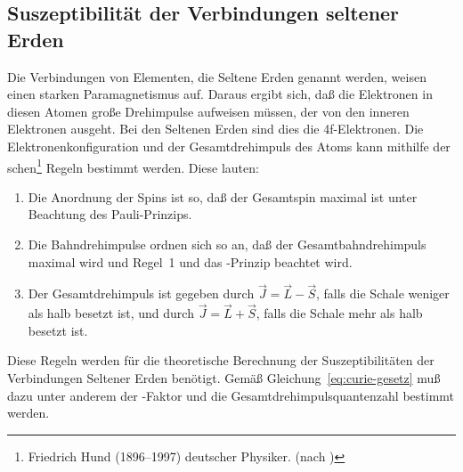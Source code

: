 \subsection{Suszeptibilität der Verbindungen seltener Erden}

Die Verbindungen von Elementen, die Seltene Erden genannt werden, weisen
einen starken Paramagnetismus auf.  Daraus ergibt sich, daß die
Elektronen in diesen Atomen große Drehimpulse aufweisen müssen, der von
den inneren Elektronen ausgeht.  Bei den Seltenen Erden sind dies die
4f-Elektronen.  Die Elektronenkonfiguration und der Gesamtdrehimpuls des
Atoms kann mithilfe der schen\footnote{Friedrich Hund
  (1896--1997) deutscher Physiker. (nach
  \textcite{wikipedia:friedrich-hund})} Regeln bestimmt werden. Diese
lauten:

\begin{enumerate}
\item Die Anordnung der Spins ist so, daß der Gesamtspin maximal ist
  unter Beachtung des Pauli-Prinzips.
\item Die Bahndrehimpulse ordnen sich so an, daß der
  Gesamtbahndrehimpuls maximal wird und Regel~1 und das
  -Prinzip beachtet wird.
\item Der Gesamtdrehimpuls ist gegeben durch $\vec{J} = \vec{L} -
  \vec{S}$, falls die Schale weniger als halb besetzt ist, und durch
  $\vec{J} = \vec{L} + \vec{S}$, falls die Schale mehr als halb besetzt
  ist.
\end{enumerate}
Diese Regeln werden für die theoretische Berechnung der
Suszeptibilitäten der Verbindungen Seltener Erden benötigt.  Gemäß
Gleichung~\eqref{eq:curie-gesetz} muß dazu unter anderem der
-Faktor und die Gesamtdrehimpulsquantenzahl bestimmt werden.
